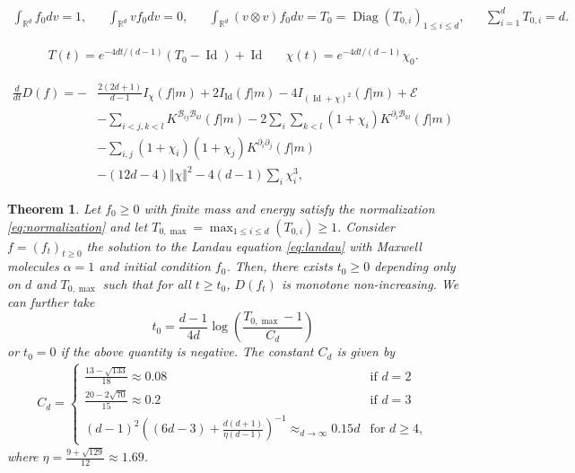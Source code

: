 \documentclass[10pt,a4paper]{amsart}
\newtheorem{theorem}{Theorem}
\DeclareMathOperator*{\Diag}{Diag}
\DeclareMathOperator*{\Id}{Id}
\begin{document}
 \begin{align}
    \label{eq:normalization}
        \int_{\mathbb{R}^d} f_0 dv=1, &&\! \int_{\mathbb{R}^d} v f_0 dv=0,&& \! \int_{\mathbb{R}^d} (v\otimes v) f_0 dv=T_0=\Diag(T_{0,i})_{1\leq i \leq d},&&\!  \sum_{i=1}^d T_{0,i}=d.
    \end{align}

\begin{align}
\label{eq:T}
    T(t) = e^{-4dt/(d-1)} (T_0-\Id)+\Id && \chi(t)=e^{-4dt/(d-1)}\chi_0.
\end{align}

\begin{align}
\label{eq:derivD3}
    \frac{d}{dt}D(f)
    =-&\frac{2(2d+1)}{d-1}I_\chi(f\vert m)+2I_{\Id}(f\vert m)-4I_{(\Id +\chi)^2}(f\vert m)+\mathcal{E}\\
    &-\sum_{i<j,k<l}K^{ \mathcal{B}_{ij}\mathcal{B}_{kl}}(f\vert m)-2\sum_i\sum_{k<l}(1+\chi_i)K^{\partial_i\mathcal{B}_{kl} }(f\vert m)\nonumber\\
    &-\sum_{i,j}(1+\chi_i)(1+\chi_j)K^{\partial_i\partial_j}(f\vert m)\nonumber\\
    &-(12d-4)\Vert \chi\Vert^2-4(d-1)\sum_i\chi_i^3,\nonumber
\end{align}

\begin{theorem}
\label{thm:main}
    Let $f_0\geq 0$ with finite mass and energy satisfy the normalization \eqref{eq:normalization}
    and let $T_{0,\max}=\max_{1\leq i \leq d} (T_{0,i})\geq 1$. Consider $f=(f_t)_{t\geq 0}$ the solution to the Landau equation \eqref{eq:landau} with Maxwell molecules $\alpha=1$ and initial condition $f_0$.
    Then, there exists $t_0 \geq 0$ depending only on $d$ and $T_{0,\max}$ such that for all $t\geq t_0$, $D(f_t)$ is monotone non-increasing.
    We can further take 
    $$t_0=\frac{d-1}{4d}\log\left(\frac{T_{0,\max}-1}{C_d}\right)$$
    or $t_0=0$ if the above quantity is negative. The constant $C_d$ is given by
    \begin{align*}
       C_d= \begin{cases}
            \frac{13-\sqrt{133}}{18}\approx 0.08 & \text{if }d=2 \\
            \frac{20-2\sqrt{70}}{15}\approx 0.2 & \text{if }d=3 \\
         (d-1)^2\left((6d-3)+\frac{d(d+1)}{\eta(d-1)}\right)^{-1}\approx_{d\rightarrow \infty} 0.15d & \text{for }d\geq 4,
        \end{cases}
    \end{align*}
    where $\eta=\frac{9+\sqrt{129}}{12}\approx 1.69$.
\end{theorem}
\end{document}
